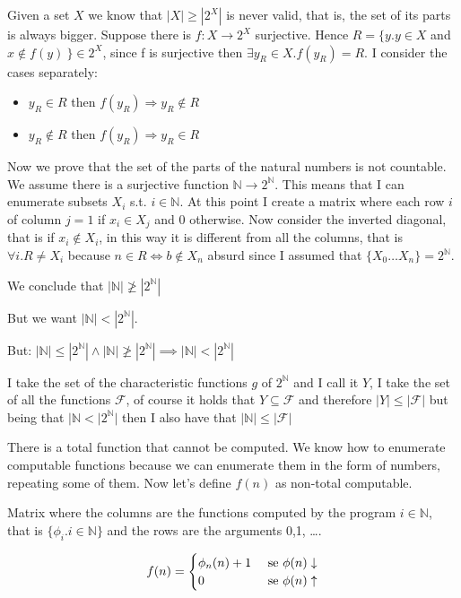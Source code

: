 \documentclass{amsbook}
\newcommand{\nat}{\ensuremath{\mathbb{N}}}
\theoremstyle{definition}
\theoremstyle{remark}
\numberwithin{section}{chapter}
\numberwithin{equation}{chapter}
\begin{document}
Given a set $X$ we know that $ |X| \geq |2^X| $ is never valid, that is, the set of its parts is always bigger. Suppose there is $ f:X\rightarrow2^X $ surjective. Hence $ R = \{y . y \in X $ and $ x \not \in f(y) \ \} \in 2^X $, since f is surjective then $ \exists y_R \in X . f(y_R)  = R$. I consider the cases separately:
\begin{itemize}
	\item $ y_R \in R $ then $f(y_R) \Rightarrow y_R \not \in R $
	\item $ y_R \not \in R $ then $ f(y_R) \Rightarrow y_R \in R$
\end{itemize}
Now we prove that the set of the parts of the natural numbers is not countable. We assume there is a surjective function $ \nat \rightarrow 2^\nat $. This means that I can enumerate subsets $ X_i $ s.t. $ i \in \nat $. At this point I create a matrix where each row $i$ of column $j = 1$ if $ x_i \in X_j $ and 0 otherwise. Now consider the inverted diagonal, that is if $ x_i \not \in X_i $, in this way it is different from all the columns, that is $ \forall i . R \not= X_i $ because $ n \in R \Leftrightarrow b \not \in X_n $ absurd since I assumed that $ \{X_0 \dots X_n \} = 2^\nat$.

We conclude that $ |\nat| \not \geq |2^\nat| $

But we want $ |\nat| < |2^\nat| $.

But: $ |\nat| \leq |2^\nat| \land |\nat| \not\geq |2^\nat| \implies |\nat| < |2^\nat| $

I take the set of the characteristic functions $g$ of $ 2^\nat $ and I call it $Y$, I take the set of all the functions $ \mathcal{F} $, of course it holds that $ Y \subseteq \mathcal{F} $ and therefore $ |Y| \leq |\mathcal{F}| $ but being that $ |\nat < |2^\nat| $ then I also have that $ |\nat| \leq |\mathcal{F}| $

There is a total function that cannot be computed. We know how to enumerate computable functions because we can enumerate them in the form of numbers, repeating some of them. Now let's define $ f(n) $ as non-total computable.

Matrix where the columns are the functions computed by the program $ i \in \nat $, that is $ \{\phi_i . i \in \nat \} $ and the rows are the arguments 0,1, \dots.

\begin{equation*}
	f(n) = \begin{cases}
		\phi_n(n)+1 & $ se $\phi(n)\downarrow \\
		0           & $ se $\phi(n)\uparrow
	\end{cases}
\end{equation*}
\end{document}
